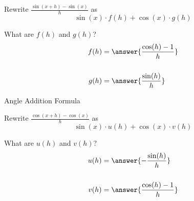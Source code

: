 \documentclass{ximera}
\author{Bobby Ramsey}
\begin{document}
\begin{exercise}

	Rewrite $\frac{\sin(x + h) - \sin(x)}{h}$ as 
	\[\sin(x) \cdot f(h) + \cos(x) \cdot g(h)\]
	
	What are $f(h)$ and $g(h)$?
	\begin{align*}
		f(h) &= \answer{\frac{\cos(h)-1}{h}} \\ \\
		g(h) &= \answer{\frac{\sin(h)}{h}} \\
	\end{align*}
	\begin{hint}
		Angle Addition Formula
	\end{hint}
	
	\begin{exercise}
		Rewrite $\frac{\cos(x + h) - \cos(x)}{h}$ as 
		\[\sin(x) \cdot u(h) + \cos(x) \cdot v(h)\]
	
		What are $u(h)$ and $v(h)$?
		\begin{align*}
			u(h) &= \answer{-\frac{\sin(h)}{h}} \\ \\
			v(h) &= \answer{\frac{\cos(h)-1}{h}} \\
		\end{align*}
	
	\end{exercise}
\end{exercise}
\end{document}
